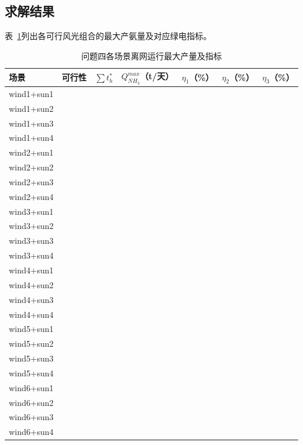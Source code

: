 \documentclass[UTF8,12pt,a4paper]{ctexart}
\newcommand{\blank}[1]{\underline{\makebox[#1][c]{}}}
\newcommand{\RES}{\blank{2cm}}          %
\begin{document}
\subsection{求解结果}

表~\ref{tab:p4_results}列出各可行风光组合的最大产氨量及对应绿电指标。

\begin{table}[htbp]
\centering
\caption{问题四各场景离网运行最大产量及指标}
\label{tab:p4_results}
\small
\setlength{\tabcolsep}{5pt}
\begin{tabular}{lcccccc}
\toprule
场景 & 可行性 & $\sum t_h^*$ & $Q_{NH_3}^{max}$（t/天） & $\eta_1$（\%） & $\eta_2$（\%） & $\eta_3$（\%） \\
\midrule
wind1+sun1 & \RES & \RES & \RES & \RES & \RES & \RES \\
wind1+sun2 & \RES & \RES & \RES & \RES & \RES & \RES \\
wind1+sun3 & \RES & \RES & \RES & \RES & \RES & \RES \\
wind1+sun4 & \RES & \RES & \RES & \RES & \RES & \RES \\
wind2+sun1 & \RES & \RES & \RES & \RES & \RES & \RES \\
wind2+sun2 & \RES & \RES & \RES & \RES & \RES & \RES \\
wind2+sun3 & \RES & \RES & \RES & \RES & \RES & \RES \\
wind2+sun4 & \RES & \RES & \RES & \RES & \RES & \RES \\
wind3+sun1 & \RES & \RES & \RES & \RES & \RES & \RES \\
wind3+sun2 & \RES & \RES & \RES & \RES & \RES & \RES \\
wind3+sun3 & \RES & \RES & \RES & \RES & \RES & \RES \\
wind3+sun4 & \RES & \RES & \RES & \RES & \RES & \RES \\
wind4+sun1 & \RES & \RES & \RES & \RES & \RES & \RES \\
wind4+sun2 & \RES & \RES & \RES & \RES & \RES & \RES \\
wind4+sun3 & \RES & \RES & \RES & \RES & \RES & \RES \\
wind4+sun4 & \RES & \RES & \RES & \RES & \RES & \RES \\
wind5+sun1 & \RES & \RES & \RES & \RES & \RES & \RES \\
wind5+sun2 & \RES & \RES & \RES & \RES & \RES & \RES \\
wind5+sun3 & \RES & \RES & \RES & \RES & \RES & \RES \\
wind5+sun4 & \RES & \RES & \RES & \RES & \RES & \RES \\
wind6+sun1 & \RES & \RES & \RES & \RES & \RES & \RES \\
wind6+sun2 & \RES & \RES & \RES & \RES & \RES & \RES \\
wind6+sun3 & \RES & \RES & \RES & \RES & \RES & \RES \\
wind6+sun4 & \RES & \RES & \RES & \RES & \RES & \RES \\
\bottomrule
\end{tabular}
\end{table}
\end{document}
